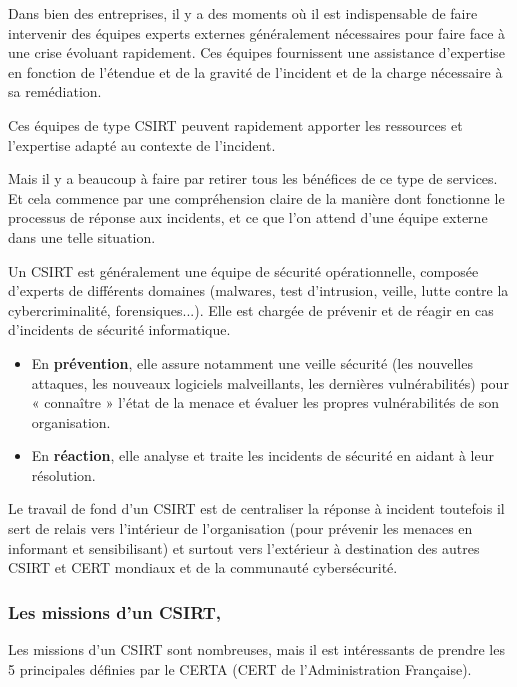 Dans bien des entreprises, il y a des moments où il est indispensable de faire intervenir des équipes experts externes généralement nécessaires pour faire face à une crise évoluant rapidement. Ces équipes fournissent une assistance d'expertise en fonction de l’étendue et de la gravité de l’incident et de la charge nécessaire à sa remédiation.

Ces équipes de type CSIRT peuvent rapidement apporter les ressources et l’expertise adapté au contexte de l'incident.

 Mais il y a beaucoup à faire par retirer tous les bénéfices de ce type de services. Et cela commence par une compréhension claire de la manière dont fonctionne le processus de réponse aux incidents, et ce que l’on attend d’une équipe externe dans une telle situation.
 
 
 Un CSIRT est généralement une équipe de sécurité opérationnelle, composée d’experts de différents domaines (malwares, test d’intrusion, veille, lutte contre la cybercriminalité, forensiques...). Elle est chargée de prévenir et de réagir en cas d’incidents de sécurité informatique.
\begin{itemize}
  \item En \textbf{prévention}, elle assure notamment une veille sécurité (les nouvelles attaques, les nouveaux logiciels malveillants, les dernières vulnérabilités) pour « connaître » l’état de la menace et évaluer les propres vulnérabilités de son organisation.
  \item En \textbf{réaction}, elle analyse et traite les incidents de sécurité en aidant à leur résolution.
\end{itemize}

Le travail de fond d'un CSIRT est de centraliser la réponse à incident toutefois il sert de relais vers l’intérieur de l’organisation (pour prévenir les menaces en informant et sensibilisant) et surtout vers l’extérieur à destination des autres CSIRT et CERT mondiaux et de la communauté cybersécurité.
 
  \subsubsection{Les missions d’un CSIRT,}
 Les missions d’un CSIRT sont nombreuses, mais il est intéressants de prendre les 5 principales définies par le CERTA (CERT de l'Administration Française).

